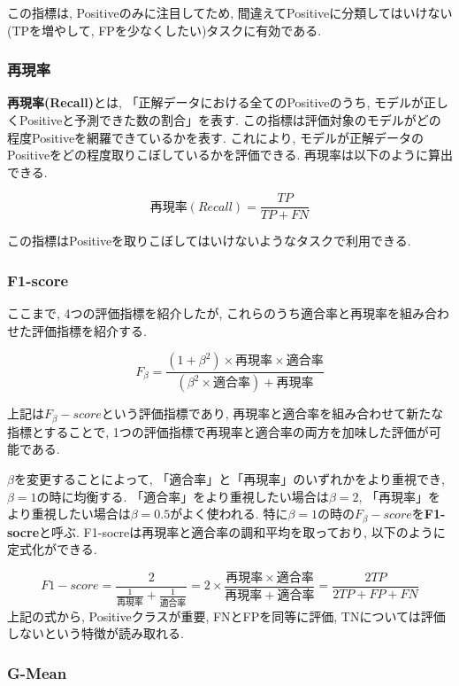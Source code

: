 \documentclass[dvipdfmx]{jsarticle}
\begin{document}
この指標は, Positiveのみに注目してため, 間違えてPositiveに分類してはいけない(TPを増やして, FPを少なくしたい)タスクに有効である.

\subsubsection{再現率}
\textbf{再現率(Recall)}とは, 「正解データにおける全てのPositiveのうち, モデルが正しくPositiveと予測できた数の割合」を表す.
この指標は評価対象のモデルがどの程度Positiveを網羅できているかを表す.
これにより, モデルが正解データのPositiveをどの程度取りこぼしているかを評価できる.
再現率は以下のように算出できる.

\begin{equation}
    再現率(Recall) = \frac{TP}{TP+FN}
\end{equation}

この指標はPositiveを取りこぼしてはいけないようなタスクで利用できる.

\subsubsection{F1-score}
ここまで, 4つの評価指標を紹介したが, これらのうち適合率と再現率を組み合わせた評価指標を紹介する.

\begin{equation}
    F_{\beta} = \frac{(1+{\beta}^2) \times 再現率 \times 適合率}{({\beta}^2 \times 適合率)+再現率}
\end{equation}

上記は\textbf{$F_{\beta}-score$}という評価指標であり, 再現率と適合率を組み合わせて新たな指標とすることで, 1つの評価指標で再現率と適合率の両方を加味した評価が可能である.

${\beta}$を変更することによって, 「適合率」と「再現率」のいずれかをより重視でき,  ${\beta}=1$の時に均衡する.
「適合率」をより重視したい場合は${\beta}=2$, 「再現率」をより重視したい場合は${\beta}=0.5$がよく使われる.
特に${\beta}=1$の時の$F_{\beta}-score$を\textbf{F1-socre}と呼ぶ.
F1-socreは再現率と適合率の調和平均を取っており, 以下のように定式化ができる.

\begin{equation}
    F1-score = \frac{2}{\frac{1}{再現率}+\frac{1}{適合率}}=2\times\frac{再現率 \times 適合率}{再現率+適合率}=\frac{2TP}{2TP+FP+FN}
\end{equation}
上記の式から, Positiveクラスが重要, FNとFPを同等に評価, TNについては評価しないという特徴が読み取れる.

\subsubsection{G-Mean}
\end{document}
